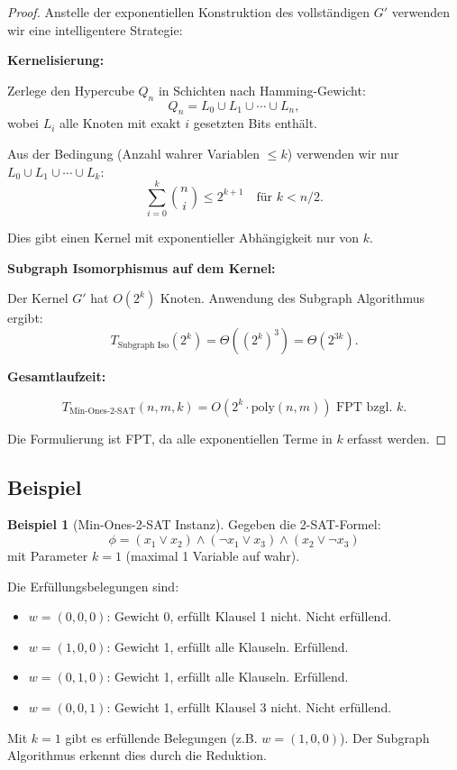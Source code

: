 ﻿\documentclass[a4paper,12pt]{article}
\theoremstyle{definition}
\newtheorem{beispiel}{Beispiel}[section]
\begin{document}
\begin{proof}
	Anstelle der exponentiellen Konstruktion des vollständigen $G'$ verwenden wir eine intelligentere Strategie:
	
	\textbf{Kernelisierung:}
	
	Zerlege den Hypercube $Q_n$ in Schichten nach Hamming-Gewicht:
	\[
	Q_n = L_0 \cup L_1 \cup \cdots \cup L_n,
	\]
	wobei $L_i$ alle Knoten mit exakt $i$ gesetzten Bits enthält.
	
	Aus der Bedingung (Anzahl wahrer Variablen $\leq k$) verwenden wir nur $L_0 \cup L_1 \cup \cdots \cup L_k$:
	\[
	\sum_{i=0}^{k} \binom{n}{i} \leq 2^{k+1} \quad \text{für } k < n/2.
	\]
	
	Dies gibt einen Kernel mit exponentieller Abhängigkeit nur von $k$.
	
	\textbf{Subgraph Isomorphismus auf dem Kernel:}
	
	Der Kernel $G'$ hat $O(2^k)$ Knoten. Anwendung des Subgraph Algorithmus ergibt:
	\[
	T_{\text{Subgraph Iso}}(2^k) = \Theta((2^k)^3) = \Theta(2^{3k}).
	\]
	
	\textbf{Gesamtlaufzeit:}
	
	\[
	T_{\text{Min-Ones-2-SAT}}(n, m, k) = O(2^{k} \cdot \text{poly}(n, m)) \text{ FPT bzgl. } k.
	\]
	
	Die Formulierung ist FPT, da alle exponentiellen Terme in $k$ erfasst werden.
\end{proof}

\subsection{Beispiel}

\begin{beispiel}[Min-Ones-2-SAT Instanz]
	Gegeben die 2-SAT-Formel:
	\[
	\phi = (x_1 \lor x_2) \land (\neg x_1 \lor x_3) \land (x_2 \lor \neg x_3)
	\]
	mit Parameter $k = 1$ (maximal 1 Variable auf wahr).
	
	Die Erfüllungsbelegungen sind:
	\begin{itemize}
		\item $w = (0, 0, 0)$: Gewicht 0, erfüllt Klausel 1 nicht. Nicht erfüllend.
		\item $w = (1, 0, 0)$: Gewicht 1, erfüllt alle Klauseln. Erfüllend.
		\item $w = (0, 1, 0)$: Gewicht 1, erfüllt alle Klauseln. Erfüllend.
		\item $w = (0, 0, 1)$: Gewicht 1, erfüllt Klausel 3 nicht. Nicht erfüllend.
	\end{itemize}
	
	Mit $k=1$ gibt es erfüllende Belegungen (z.B. $w = (1,0,0)$). Der Subgraph Algorithmus erkennt dies durch die Reduktion.
\end{beispiel}
\end{document}

